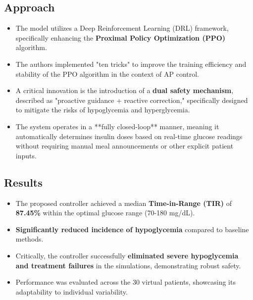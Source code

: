 \subsection*{Approach}
\begin{itemize}
    \item The model utilizes a Deep Reinforcement Learning (DRL) framework, specifically enhancing the \textbf{Proximal Policy Optimization (PPO)} algorithm.
    \item The authors implemented "ten tricks" to improve the training efficiency and stability of the PPO algorithm in the context of AP control.
    \item A critical innovation is the introduction of a \textbf{dual safety mechanism}, described as "proactive guidance + reactive correction," specifically designed to mitigate the risks of hypoglycemia and hyperglycemia.
    \item The system operates in a **fully closed-loop** manner, meaning it automatically determines insulin doses based on real-time glucose readings without requiring manual meal announcements or other explicit patient inputs.
\end{itemize}

\subsection*{Results}
\begin{itemize}
    \item The proposed controller achieved a median \textbf{Time-in-Range (TIR)} of \textbf{87.45\%} within the optimal glucose range (70-180 mg/dL).
    \item \textbf{Significantly reduced incidence of hypoglycemia} compared to baseline methods.
    \item Critically, the controller successfully \textbf{eliminated severe hypoglycemia and treatment failures} in the simulations, demonstrating robust safety.
    \item Performance was evaluated across the 30 virtual patients, showcasing its adaptability to individual variability.
\end{itemize}

